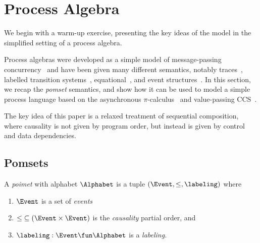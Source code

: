 \section{Process Algebra}

We begin with a warm-up exercise, presenting the key ideas of the
model in the simplified setting of a process algebra.

Process algebras were developed as a simple model of message-passing
concurrency~\cite{DBLP:books/daglib/0067019,DBLP:books/ph/Hoare85,DBLP:books/daglib/0069083}
and have been given many different semantics, notably traces~\cite{???},
labelled transition systems~\cite{???}, equational~\cite{???}, and event
structures~\cite{???}.  In this section, we recap the \emph{pomset}
semantics, and show how it can be used to model a simple process language
based on the asynchronous $\pi$-calculus~\cite{???} and value-passing
CCS~\cite{???}.

The key idea of this paper is a relaxed treatment of sequential
composition, where causality is not given by program order, but
instead is given by control and data dependencies.


\subsection{Pomsets}

\begin{definition}
  A \emph{poimet} with alphabet $\Alphabet$ is a tuple
  $(\Event, {\le}, \labeling)$ where
  \begin{enumerate}
  \item $\Event$ is a set of \emph{events}
  \item
    ${\le} \subseteq (\Event\times\Event)$ is the \emph{causality} partial order, and
  \item
    $\labeling: \Event \fun \Alphabet$ is a \emph{labeling}.
  \end{enumerate}
\end{definition}


